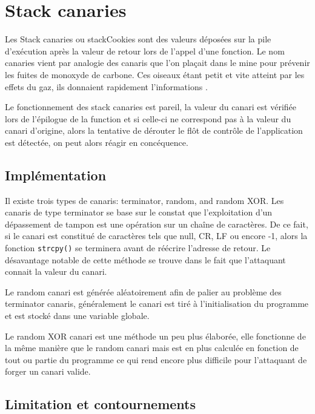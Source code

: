 \section{Stack canaries}

Les \og Stack canaries \fg ou \og \gls{stackCookies} \fg sont des valeurs déposées sur la pile d'exécution après la valeur de retour lors de l'appel d'une fonction. Le nom \og canaries \fg vient par analogie des canaris que l'on plaçait dans le mine pour prévenir les fuites de monoxyde de carbone. Ces oiseaux étant petit et vite atteint par les effets du gaz, ils donnaient rapidement l'informations \cite{StackCanaries} \cite{SentinelSpecies}.

Le fonctionnement des \og stack canaries \fg est pareil, la valeur du canari est vérifiée lors de l'épilogue de la function et si celle-ci ne correspond pas à la valeur du canari d'origine, alors la tentative de dérouter le flôt de contrôle de l'application est détectée, on peut alors réagir en concéquence.

\subsection{Implémentation}

Il existe trois types de canaris: terminator, random, and random XOR. Les canaris de type terminator se base sur le constat que l'exploitation d'un dépassement de tampon est une opération sur un chaîne de caractères. De ce fait, si le canari est constitué de caractères tels que null, CR, LF ou encore -1, alors la fonction \texttt{strcpy()} se terminera avant de réécrire l'adresse de retour. Le désavantage notable de cette méthode se trouve dans le fait que l'attaquant connait la valeur du canari.

Le random canari est générée aléatoirement afin de palier au problème des terminator canaris, généralement le canari est tiré à l'initialisation du programme et est stocké dans une variable globale.

Le random XOR canari est une méthode un peu plus élaborée, elle fonctionne de la même manière que le random canari mais est en plus calculée en fonction de tout ou partie du programme ce qui rend encore plus difficile pour l'attaquant de forger un canari valide.

\subsection{Limitation et contournements}

